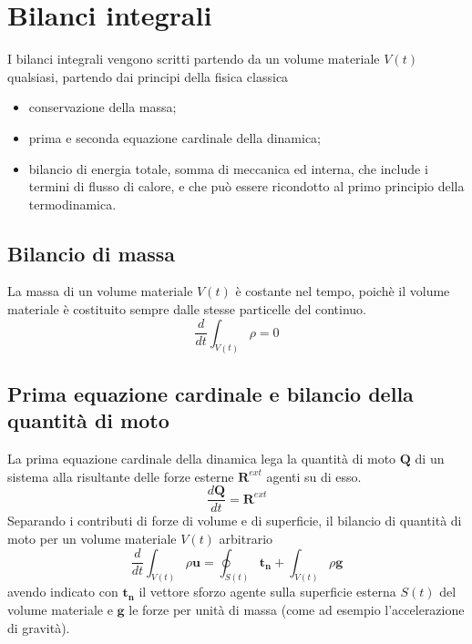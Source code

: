 \section{Bilanci integrali}
I bilanci integrali vengono scritti partendo da un volume materiale $V(t)$ qualsiasi, partendo dai principi della fisica classica
\begin{itemize}
  \item conservazione della massa;
  \item prima e seconda equazione cardinale della dinamica;
  \item bilancio di energia totale, somma di meccanica ed interna, che include i termini di flusso di calore, e che può essere
        ricondotto al primo principio della termodinamica.
\end{itemize}

\subsection{Bilancio di massa}
 La massa di un volume materiale $V(t)$ è costante nel tempo, poichè il volume materiale è costituito sempre dalle stesse particelle del
 continuo.
\begin{equation}
 \dfrac{d}{dt} \int_{V(t)} \rho = 0
\end{equation}

\subsection{Prima equazione cardinale e bilancio della quantità di moto}
La prima equazione cardinale della dinamica lega la quantità di moto $\bm{Q}$ di un sistema alla risultante delle forze esterne $\bm{R}^{ext}$
 agenti su di esso.
\begin{equation}
 \dfrac{d\bm{Q}}{d t} = \bm{R}^{ext}
\end{equation}
Separando i contributi di forze di volume e di superficie, il bilancio di quantità di moto per un volume materiale $V(t)$ arbitrario
\begin{equation}
 \dfrac{d}{d t} \int_{V(t)} \rho \bm{u} = \oint_{S(t)} \bm{t_n} + \int_{V(t)} \rho \bm{g}
\end{equation}
avendo indicato con $\bm{t_n}$ il vettore sforzo agente sulla superficie esterna $S(t)$ del volume materiale e $\bm{g}$ le forze per unità di
 massa (come ad esempio l'accelerazione di gravità).

